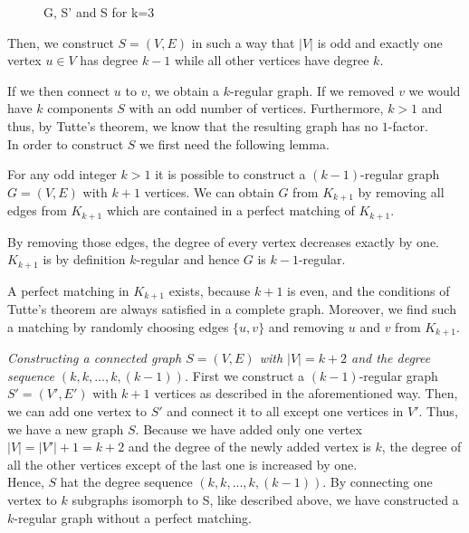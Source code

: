 \documentclass[a4paper]{article}
\begin{document}
\begin{solution}{11}
\begin{figure}[h]
		\caption{G, S' and S for k=3}
		\end{figure}
		Then, we construct $S=(V,E)$ in such a way that $|V|$ is odd and exactly one vertex $u \in V$ has degree $k-1$ while all other vertices have degree $k$.
 
		If we then connect $u$ to $v$, we obtain a $k$-regular graph. If we removed $v$ we would have $k$ components $S$ with an odd number of vertices. Furthermore, $k > 1$ and thus, by Tutte's theorem, we know that the resulting graph has no $1$-factor.\\
		
		In order to construct $S$ we first need the following lemma.
		\begin{lemma}{For any odd integer $k > 1$ it is possible to construct a $(k-1)$-regular graph $G=(V,E)$ with $k+1$ vertices.}
			We can obtain $G$ from $K_{k+1}$ by removing all edges from $K_{k+1}$ which are contained in a perfect matching of $K_{k+1}$. 

			By removing those edges, the degree of every vertex decreases exactly by one. 
			$K_{k+1}$ is by definition $k$-regular and hence $G$ is $k-1$-regular.

			A perfect matching in $K_{k+1}$ exists, because $k+1$ is even, and the conditions of Tutte's theorem are always satisfied in a complete graph. Moreover, we find such a matching by randomly choosing edges $\{u,v\}$ and removing $u$ and $v$ from $K_{k+1}$. 
		\end{lemma}
		
		\emph{Constructing a connected graph $S=(V,E)$ with $|V|=k+2$ and the degree sequence $( k,k,...,k,(k-1))$. }  
		First we construct a $(k-1)$-regular graph $S' = (V',E')$ with $k+1$ vertices as described in the aforementioned way. Then, we can add one vertex to $S'$ and connect it to all except one vertices in $V'$. Thus, we have a new graph $S$. 
		Because we have added only one vertex $|V| = |V'| +1 = k+2$ and the degree of the newly added vertex is $k$, the degree of all the other vertices except of the last one is increased by one.\\

		Hence, $S$ hat the degree sequence $(k,k,...,k,(k-1))$. 
		By connecting one vertex to $k$ subgraphs isomorph to S, like described above, we have constructed a $k$-regular graph without a perfect matching.
	\end{solution}
\end{document}
